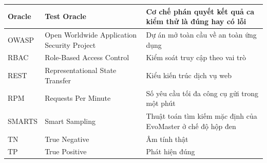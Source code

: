 {\begin{longtable}{|>{\raggedright\arraybackslash}m{2.6cm}|>{\raggedright\arraybackslash}m{6.1cm}|>{\raggedright\arraybackslash}m{5.8cm}|}
Oracle & Test Oracle & Cơ chế phán quyết kết quả ca kiểm thử là đúng hay có lỗi \\ \hline
OWASP & Open Worldwide Application Security Project & Dự án mở toàn cầu về an toàn ứng dụng \\ \hline
RBAC & Role-Based Access Control & Kiểm soát truy cập theo vai trò \\ \hline
REST & Representational State Transfer & Kiểu kiến trúc dịch vụ web \\ \hline
RPM & Requests Per Minute & Số yêu cầu tối đa công cụ gửi trong một phút \\ \hline
SMARTS & Smart Sampling & Thuật toán tìm kiếm mặc định của EvoMaster ở chế độ hộp đen \\ \hline
TN & True Negative & Âm tính thật \\ \hline
TP & True Positive & Phát hiện đúng \\ \hline
\end{longtable}
}
